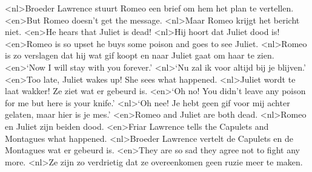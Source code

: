 <nl>Broeder Lawrence stuurt Romeo een brief om hem het plan te vertellen.
<en>But Romeo doesn’t get the message. 
<nl>Maar Romeo krijgt het bericht niet.
<en>He hears that Juliet is dead!
<nl>Hij hoort dat Juliet dood is!
<en>Romeo is so upset he buys some poison and goes to see Juliet.
<nl>Romeo is zo verslagen dat hij wat gif koopt en naar Juliet gaat om haar te zien.
<en>‘Now I will stay with you forever.’
<nl>`Nu zal ik voor altijd bij je blijven.'
<en>Too late, Juliet wakes up! She sees what happened.
<nl>Juliet wordt te laat wakker! Ze ziet wat er gebeurd is.
<en>‘Oh no! You didn’t leave any poison for me but here is your knife.’
<nl>`Oh nee! Je hebt geen gif voor mij achter gelaten, maar hier is je mes.'
<en>Romeo and Juliet are both dead. 
<nl>Romeo en Juliet zijn beiden dood.
<en>Friar Lawrence tells the Capulets and Montagues what happened. 
<nl>Broeder Lawrence vertelt de Capulets en de Montagues wat er gebeurd is.
<en>They are so sad they agree not to fight any more.
<nl>Ze zijn zo verdrietig dat ze overeenkomen geen ruzie meer te maken.
